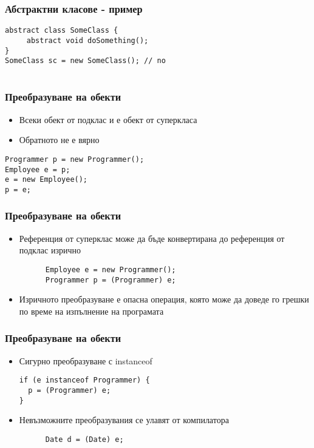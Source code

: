 \documentclass{beamer}
\begin{document}
\begin{frame}[fragile]
  \frametitle{Абстрактни класове - пример}
  \transdissolve
\begin{lstlisting}
abstract class SomeClass {
     abstract void doSomething();
}
SomeClass sc = new SomeClass(); // no
  
\end{lstlisting}
\end{frame}

\begin{frame}[fragile]
  \frametitle{Преобразуване на обекти}
  \transdissolve
  \begin{itemize}
  \item Всеки обект от подклас и е обект от суперкласа
  \item Обратното не е вярно
  \end{itemize}
\begin{lstlisting}
Programmer p = new Programmer();
Employee e = p;
e = new Employee();
p = e;
\end{lstlisting}
\end{frame}

\begin{frame}[fragile]
  \frametitle{Преобразуване на обекти}
  \transdissolve
  \begin{itemize}
  \item Референция от суперклас може да бъде конвертирана до
    референция от подклас изрично
    \begin{lstlisting}
      Employee e = new Programmer();
      Programmer p = (Programmer) e;
    \end{lstlisting}
  \item Изричното преобразуване е опасна операция, която може да
    доведе го грешки по време на изпълнение на програмата
  \end{itemize}
\end{frame}

\begin{frame}[fragile]
  \frametitle{Преобразуване на обекти}
  \transdissolve
  \begin{itemize}
  \item Сигурно преобразуване с instanceof
    \begin{lstlisting}
if (e instanceof Programmer) {
  p = (Programmer) e;
}
    \end{lstlisting}
  \item Невъзможните преобразувания се улавят от компилатора
    \begin{lstlisting}
      Date d = (Date) e;
    \end{lstlisting}
  \end{itemize}
\end{frame}
\end{document}
